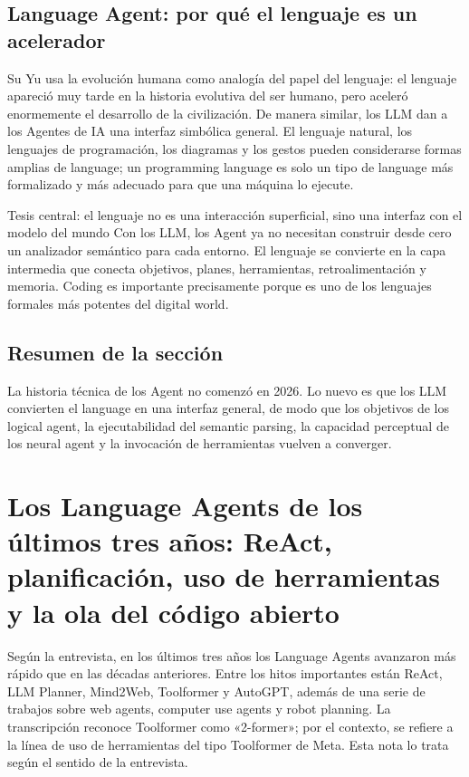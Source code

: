 \documentclass[a4paper]{article}
\begin{document}
\subsection{Language Agent: por qué el lenguaje es un acelerador}

Su Yu usa la evolución humana como analogía del papel del lenguaje: el lenguaje apareció muy tarde en la historia evolutiva del ser humano, pero aceleró enormemente el desarrollo de la civilización. De manera similar, los LLM dan a los Agentes de IA una interfaz simbólica general. El lenguaje natural, los lenguajes de programación, los diagramas y los gestos pueden considerarse formas amplias de language; un programming language es solo un tipo de language más formalizado y más adecuado para que una máquina lo ejecute.

\begin{importantbox}{Tesis central: el lenguaje no es una interacción superficial, sino una interfaz con el modelo del mundo}
Con los LLM, los Agent ya no necesitan construir desde cero un analizador semántico para cada entorno. El lenguaje se convierte en la capa intermedia que conecta objetivos, planes, herramientas, retroalimentación y memoria. Coding es importante precisamente porque es uno de los lenguajes formales más potentes del digital world.
\end{importantbox}

\subsection{Resumen de la sección}

La historia técnica de los Agent no comenzó en 2026. Lo nuevo es que los LLM convierten el language en una interfaz general, de modo que los objetivos de los logical agent, la ejecutabilidad del semantic parsing, la capacidad perceptual de los neural agent y la invocación de herramientas vuelven a converger.
\section{Los Language Agents de los últimos tres años: ReAct, planificación, uso de herramientas y la ola del código abierto}

Según la entrevista, en los últimos tres años los Language Agents avanzaron más rápido que en las décadas anteriores. Entre los hitos importantes están ReAct, LLM Planner, Mind2Web, Toolformer y AutoGPT, además de una serie de trabajos sobre web agents, computer use agents y robot planning. La transcripción reconoce Toolformer como «2-former»; por el contexto, se refiere a la línea de uso de herramientas del tipo Toolformer de Meta. Esta nota lo trata según el sentido de la entrevista.
\end{document}
